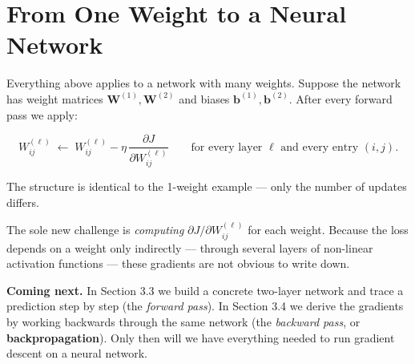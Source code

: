 \documentclass[12pt, a4paper]{article}
\theoremstyle{definition}
\begin{document}
\section{From One Weight to a Neural Network}

Everything above applies to a network with many weights.
Suppose the network has weight matrices $\mathbf{W}^{(1)}, \mathbf{W}^{(2)}$
and biases $\mathbf{b}^{(1)}, \mathbf{b}^{(2)}$.
After every forward pass we apply:

\[
  W_{ij}^{(\ell)} \;\longleftarrow\;
  W_{ij}^{(\ell)} - \eta\,\frac{\partial J}{\partial W_{ij}^{(\ell)}}
  \qquad \text{for every layer } \ell \text{ and every entry } (i,j).
\]

The structure is identical to the 1-weight example --- only the number of
updates differs.

The sole new challenge is \emph{computing}
$\partial J / \partial W_{ij}^{(\ell)}$ for each weight.
Because the loss depends on a weight only indirectly --- through several
layers of non-linear activation functions --- these gradients are not
obvious to write down.

\begin{notebox}
\textbf{Coming next.}
In Section 3.3 we build a concrete two-layer network and trace a prediction
step by step (the \emph{forward pass}).  In Section 3.4 we derive the
gradients by working backwards through the same network
(the \emph{backward pass}, or \textbf{backpropagation}).
Only then will we have everything needed to run gradient descent on a
neural network.
\end{notebox}
\end{document}

